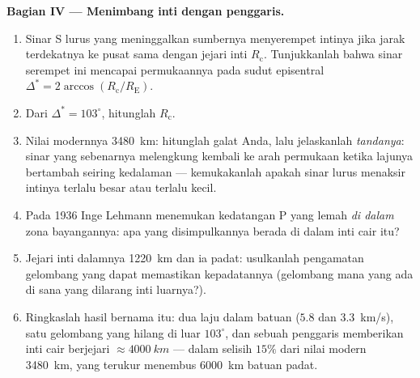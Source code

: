 \begin{problem}
\medskip\noindent\textbf{Bagian IV --- Menimbang inti dengan penggaris.}
\begin{enumerate}[resume]
  \item Sinar S lurus yang meninggalkan sumbernya menyerempet intinya
        jika jarak terdekatnya ke pusat sama dengan jejari inti
        $R_{\text{c}}$. Tunjukkanlah bahwa sinar serempet ini mencapai
        permukaannya pada sudut episentral $\Delta^* =
        2\arccos(R_{\text{c}}/R_{\text{E}})$.
  \item Dari $\Delta^* = 103^\circ$, hitunglah $R_{\text{c}}$.
  \item Nilai modernnya \qty{3480}{km}: hitunglah galat Anda, lalu
        jelaskanlah \emph{tandanya}: sinar yang sebenarnya melengkung
        kembali ke arah permukaan ketika lajunya bertambah seiring
        kedalaman --- kemukakanlah apakah sinar lurus menaksir intinya
        terlalu besar atau terlalu kecil.
  \item Pada 1936 Inge Lehmann menemukan kedatangan P yang lemah
        \emph{di dalam} zona bayangannya: apa yang disimpulkannya berada
        di dalam inti cair itu?
  \item Jejari inti dalamnya \qty{1220}{km} dan ia padat: usulkanlah
        pengamatan gelombang yang dapat memastikan kepadatannya
        (gelombang mana yang ada di sana yang dilarang inti luarnya?).
  \item Ringkaslah hasil bernama itu: dua laju  dalam
        batuan ($5.8$ dan \qty{3.3}{km/s}), satu gelombang yang hilang
        di luar $103^\circ$, dan sebuah penggaris memberikan inti cair
        berjejari $\approx \qty{4000}{km}$ --- dalam selisih $15\%$ dari
        nilai modern \qty{3480}{km}, yang terukur menembus \qty{6000}{km}
        batuan padat.
\end{enumerate}
\end{problem}

